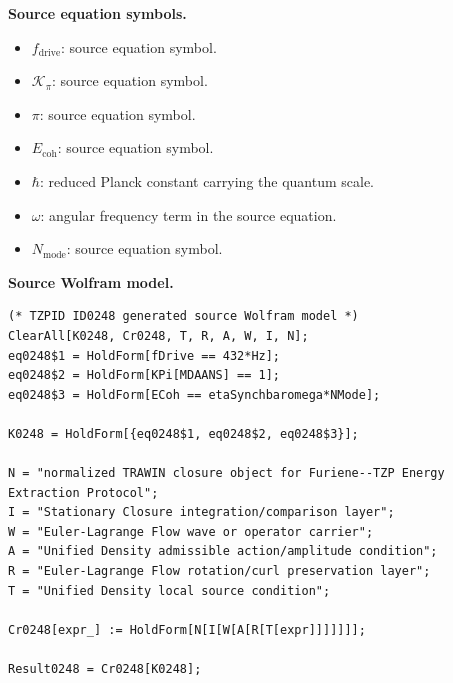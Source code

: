 \begin{minipage}[t]{0.49\linewidth}
\begingroup
\small
\raggedright
\textbf{Source equation symbols.}\par
\begin{itemize}[leftmargin=1.35em,itemsep=1pt,topsep=1pt,parsep=0pt]
    \item $f_{\mathrm{drive}}$: source equation symbol.
    \item $\mathcal{K}_{\pi}$: source equation symbol.
    \item $\pi$: source equation symbol.
    \item $E_{\mathrm{coh}}$: source equation symbol.
    \item $\hbar$: reduced Planck constant carrying the quantum scale.
    \item $\omega$: angular frequency term in the source equation.
    \item $N_{\mathrm{mode}}$: source equation symbol.
\end{itemize}
\endgroup
\end{minipage}\hfill
\begin{minipage}[t]{0.47\linewidth}
\begingroup
\scriptsize
\raggedright
\textbf{Source Wolfram model.}\par
\begin{Verbatim}[fontsize=\tiny,breaklines=true,breakanywhere=true]
(* TZPID ID0248 generated source Wolfram model *)
ClearAll[K0248, Cr0248, T, R, A, W, I, N];
eq0248$1 = HoldForm[fDrive == 432*Hz];
eq0248$2 = HoldForm[KPi[MDAANS] == 1];
eq0248$3 = HoldForm[ECoh == etaSynchbaromega*NMode];

K0248 = HoldForm[{eq0248$1, eq0248$2, eq0248$3}];

N = "normalized TRAWIN closure object for Furiene--TZP Energy Extraction Protocol";
I = "Stationary Closure integration/comparison layer";
W = "Euler-Lagrange Flow wave or operator carrier";
A = "Unified Density admissible action/amplitude condition";
R = "Euler-Lagrange Flow rotation/curl preservation layer";
T = "Unified Density local source condition";

Cr0248[expr_] := HoldForm[N[I[W[A[R[T[expr]]]]]]];

Result0248 = Cr0248[K0248];
\end{Verbatim}
\endgroup
\end{minipage}

